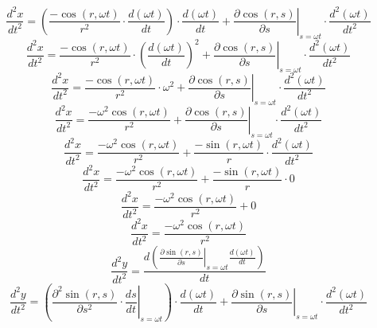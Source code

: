 \documentclass[a4paper,12pt]{report}
\begin{document}
\begin{equation}
\frac{d^2x}{dt^2} = \left(\frac{-\cos(r,\omega t)}{r^2} \cdot \frac{d (\omega t)}{dt}\right) \cdot \frac{d (\omega t)}{dt} + \left.\frac{\partial \cos(r,s)}{\partial s}\right|_{s = \omega t} \cdot \frac{d^2 (\omega t)}{dt^2}
\end{equation}
\begin{equation}
\frac{d^2x}{dt^2} = \frac{-\cos(r,\omega t)}{r^2} \cdot \left(\frac{d (\omega t)}{dt}\right)^2 + \left.\frac{\partial \cos(r,s)}{\partial s}\right|_{s = \omega t} \cdot \frac{d^2 (\omega t)}{dt^2}
\end{equation}
\begin{equation}
\frac{d^2x}{dt^2} = \frac{-\cos(r,\omega t)}{r^2} \cdot \omega^2 + \left.\frac{\partial \cos(r,s)}{\partial s}\right|_{s = \omega t} \cdot \frac{d^2 (\omega t)}{dt^2}
\end{equation}
\begin{equation}
\frac{d^2x}{dt^2} = \frac{-\omega^2 \cos(r,\omega t)}{r^2} + \left.\frac{\partial \cos(r,s)}{\partial s}\right|_{s = \omega t} \cdot \frac{d^2 (\omega t)}{dt^2}
\end{equation}
\begin{equation}
\frac{d^2x}{dt^2} = \frac{-\omega^2 \cos(r,\omega t)}{r^2} + \frac{-\sin(r,\omega t)}{r} \cdot \frac{d^2 (\omega t)}{dt^2}
\end{equation}
\begin{equation}
\frac{d^2x}{dt^2} = \frac{-\omega^2 \cos(r,\omega t)}{r^2} + \frac{-\sin(r,\omega t)}{r} \cdot 0
\end{equation}
\begin{equation}
\frac{d^2x}{dt^2} = \frac{-\omega^2 \cos(r,\omega t)}{r^2} + 0
\end{equation}
\begin{equation}
\frac{d^2x}{dt^2} = \frac{-\omega^2 \cos(r,\omega t)}{r^2}
\end{equation}
\begin{equation}
\frac{d^2y}{dt^2} = \frac{d \left(\left.\frac{\partial \sin(r,s)}{\partial s}\right|_{s = \omega t} \frac{d (\omega t)}{dt}\right)}{dt}
\end{equation}
\begin{equation}
\frac{d^2y}{dt^2} = \left(\left.\frac{\partial^2 \sin(r,s)}{\partial s^2} \cdot \frac{ds}{dt}\right|_{s = \omega t}\right) \cdot \frac{d (\omega t)}{dt} + \left.\frac{\partial \sin(r,s)}{\partial s}\right|_{s = \omega t} \cdot \frac{d^2 (\omega t)}{dt^2}
\end{equation}
\end{document}
